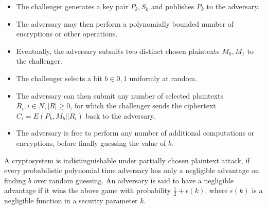 \begin{itemize} \item The challenger generates a key pair \begin{math}P_k,
S_k\end{math} and publishes \begin{math}P_k\end{math} to the adversary.  \item
The adversary may then perform a polynomially bounded number of encryptions or
other operations.  \item Eventually, the adversary submits two distinct chosen
plaintexts \begin{math}M_0, M_1\end{math} to the challenger.  \item The
challenger selects a bit \begin{math}b\in{0, 1}\end{math} uniformly at random.
\item The adversary can then submit any number of selected plaintexts
\begin{math}R_i, i\in N, |R| \geq 0\end{math}, for which the challenger sends
the ciphertext \begin{math}C_i = E(P_k, M_b||R_i)\end{math} back to the
adversary.  \item The adversary is free to perform any number of additional
computations or encryptions, before finally guessing the value of
\begin{math}b\end{math}.  \end{itemize}

A cryptosystem is indistinguishable under partially chosen plaintext attack, if
every probabilistic polynomial time adversary has only a negligible advantage on
finding \begin{math}b\end{math} over random guessing. An adversary is said to
have a negligible advantage if it wins the above game with probability
\begin{math}\frac{1}{2} + \epsilon(k)\end{math}, where
\begin{math}\epsilon(k)\end{math} is a negligible function in a security
parameter \begin{math}k\end{math}.

